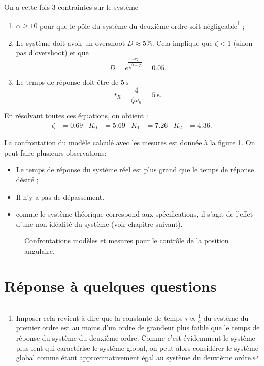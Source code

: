 \documentclass[frenchb, paper=a4, fontsize=11pt]{scrartcl}
\numberwithin{equation}{section}					%
\numberwithin{figure}{section}					%
\numberwithin{table}{section}						%
\begin{document}
On a cette fois 3 contraintes sur le système
\begin{enumerate}
	\item $\alpha \geq 10$ pour que le pôle du système du deuxième ordre soit
	négligeable\footnote{Imposer cela revient à dire que la constante de temps $\tau
	\propto \frac{1}{a}$ du système du premier ordre est au moins d'un ordre de
	grandeur plus faible que le temps de réponse du système du deuxième ordre. Comme
	c'est évidemment le système plus lent qui caractérise le système global, on peut
	alors considérer le système global comme étant approximativement égal au
	système du deuxième ordre.} ;
	\item Le système doit avoir un overshoot $D \approx 5\%$. Cela implique que
	$\zeta < 1$ (sinon pas d'overshoot) et que
	\begin{equation}
		D = e^{\frac{-\pi\zeta}{\sqrt{1-\zeta^2}}} = 0.05.
	\end{equation}
	\item Le temps de réponse doit être de $\SI{5}{\second}$
	\begin{equation}
		t_R = \frac{4}{\zeta\omega_n} = \SI{5}{\second}.
	\end{equation}
\end{enumerate}
En résolvant toutes ces équations, on obtient :
\begin{align}
	\zeta & = 0.69 & K_0 & = 5.69 & K_1 & = 7.26 &  K_2 & = 4.36.
\end{align}

La confrontation du modèle calculé avec les mesures est donnée à la
figure \ref{fig:position_control}. On peut faire plusieurs
observations:
\begin{itemize}
	\item Le temps de réponse du système réel est plus grand que le temps
	de réponse désiré ;
	\item Il n'y a pas de dépassement.
	\item comme le système théorique correspond aux spécifications, 
	il s'agit de l'effet d'une 
	non-idéalité du système (voir chapitre suivant).
\end{itemize}

\begin{figure}[ht]
	\centering
	
	\caption{Confrontations modèles et mesures pour le contrôle
	de la position angulaire.}
	\label{fig:position_control}
\end{figure}

\section{Réponse à quelques questions}
\end{document}
